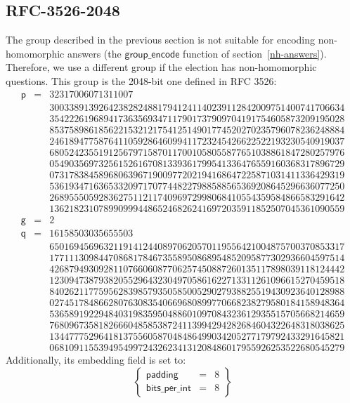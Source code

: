 \documentclass[a4paper]{article}
\begin{document}
\subsection{RFC-3526-2048}
\label{nh-group}

The group described in the previous section is not suitable for
encoding non-homomorphic answers (the $\textsf{group\_encode}$
function of section~\ref{nh-answers}). Therefore, we use a different
group if the election has non-homomorphic questions. This group is
the 2048-bit one defined in RFC 3526:
\[
\begin{array}{lcr}
\textsf{p}&=&32317006071311007\\
&&300338913926423828248817941241140239112842009751400741706634\\
&&354222619689417363569347117901737909704191754605873209195028\\
&&853758986185622153212175412514901774520270235796078236248884\\
&&246189477587641105928646099411723245426622522193230540919037\\
&&680524235519125679715870117001058055877651038861847280257976\\
&&054903569732561526167081339361799541336476559160368317896729\\
&&073178384589680639671900977202194168647225871031411336429319\\
&&536193471636533209717077448227988588565369208645296636077250\\
&&268955505928362751121174096972998068410554359584866583291642\\
&&136218231078990999448652468262416972035911852507045361090559\\
\textsf{g}&=&2\\
\textsf{q}&=&16158503035655503\\
&&650169456963211914124408970620570119556421004875700370853317\\
&&177111309844708681784673558950868954852095877302936604597514\\
&&426879493092811076606087706257450887260135117898039118124442\\
&&123094738793820552964323049705861622713311261096615270459518\\
&&840262117759562839857935058500529027938825519430923640128988\\
&&027451784866280763083540669680899770668238279580184158948364\\
&&536589192294840319835950488601097084323612935515705668214659\\
&&768096735818266604858538724113994294282684604322648318038625\\
&&134477752964181375560587048486499034205277179792433291645821\\
&&068109115539495499724326234131208486017955926253522680545279
\end{array}
\]
Additionally, its \textsf{embedding} field is set to:
\[
  \left\{
    \begin{array}{rcl}
      \textsf{padding}&=&8\\
      \textsf{bits\_per\_int}&=&8
    \end{array}
  \right\}
\]
\end{document}
